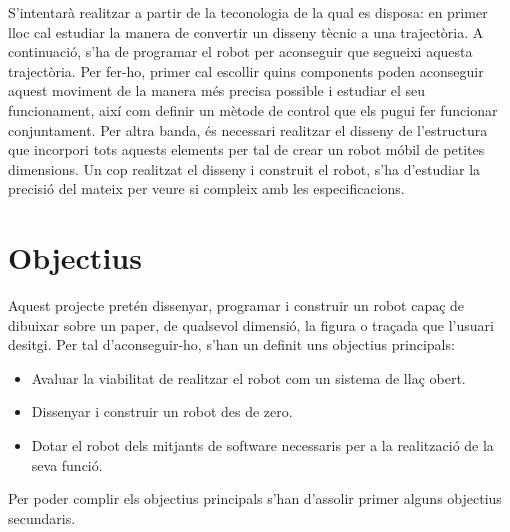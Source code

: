 S'intentarà realitzar a partir de la teconologia de la qual es disposa: en primer lloc cal estudiar la manera de convertir un disseny tècnic a una trajectòria. A continuació, s'ha de programar el robot per aconseguir que segueixi aquesta trajectòria. Per fer-ho, primer cal escollir quins components poden aconseguir aquest moviment de la manera més precisa possible i estudiar el seu funcionament, així com definir un mètode de control que els pugui fer funcionar conjuntament. Per altra banda, és necessari realitzar el disseny de l'estructura que incorpori tots aquests elements per tal de crear un robot móbil de petites dimensions. Un cop realitzat el disseny i construit el robot, s'ha d'estudiar la precisió del mateix per veure si compleix amb les especificacions.

\section{Objectius}

Aquest projecte pretén dissenyar, programar i construir un robot capaç de dibuixar sobre un paper, de qualsevol dimensió, la figura o traçada que l'usuari desitgi. Per tal d'aconseguir-ho, s'han un definit uns objectius principals:

\begin{itemize}
	\item Avaluar la viabilitat de realitzar el robot com un sistema de llaç obert.
	\item Dissenyar i construir un robot des de zero.
	\item Dotar el robot dels mitjants de software necessaris per a la realització de la seva funció. 	
\end{itemize}

Per poder complir els objectius principals s'han d'assolir primer alguns objectius secundaris. 

